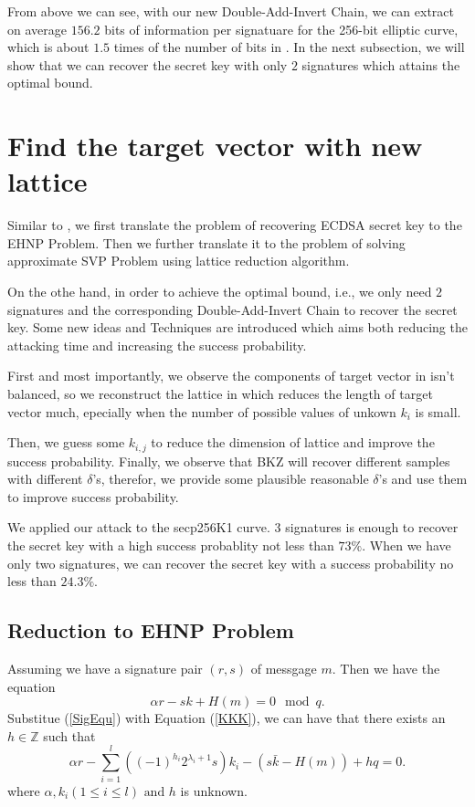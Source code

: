 \documentclass[sigconf]{acmart}
\begin{document}
    From above we can see, with our new Double-Add-Invert Chain, we can extract  on average $156.2$ bits of information per signatuare for the 256-bit elliptic curve, which is about $1.5$ times of the number of bits in \cite{FWC16} .
    In the next subsection, we will show that we can recover the secret key with only $2$ signatures which attains the optimal bound.



  \section{Find the target vector with new lattice}
  Similar to \cite{FWC16}, we first translate the problem of recovering ECDSA secret key to the EHNP Problem. Then we further translate it to the problem of solving approximate SVP Problem using lattice reduction algorithm.

     On the othe hand, in order to achieve the optimal bound, i.e., we only need $2$ signatures and the corresponding Double-Add-Invert Chain to recover the secret key. Some new ideas and Techniques are introduced which aims both reducing the attacking time and increasing the success probability.

      First and most importantly, we  observe the components of target vector in \cite{FWC16} isn't balanced,  so we reconstruct the lattice in \cite{FWC16} which reduces the length of target vector much, epecially when the number of possible values of unkown $k_i$ is small.

     Then, we guess some $k_{i,j}$ to reduce the dimension of lattice and improve the success probability. Finally, we observe that BKZ will recover different samples with different $\delta$'s, therefor, we provide some plausible reasonable $\delta$'s and use them to improve success probability.


     We applied our attack to the secp256K1 curve. 3 signatures is enough to recover the secret key with a high success probablity not less than $73\%$. When we have only two signatures, we can recover the secret key with a success probability no less than $24.3\%$.

       \subsection {Reduction to EHNP Problem}
  Assuming we have a  signature pair $(r,s)$ of messgage $m$. Then we have the equation
  \begin{equation}\label {SigEqu}
  \alpha r-sk+H(m)=0\mod q.
  \end{equation}
  Substitue (\ref{SigEqu}) with Equation ({\ref{KKK}}), we can have that there exists an $h\in \mathbb{Z}$ such that
\begin{equation}\label{SigEqu2}
\alpha r-\sum\limits_{i=1}^l((-1)^{h_i}2^{\lambda_i+1}s)k_i-(s\bar{k}-H(m))+hq=0.
\end{equation}
where $\alpha, k_i (1\leq i \leq l)\text{ and } h$ is unknown.
\end{document}
